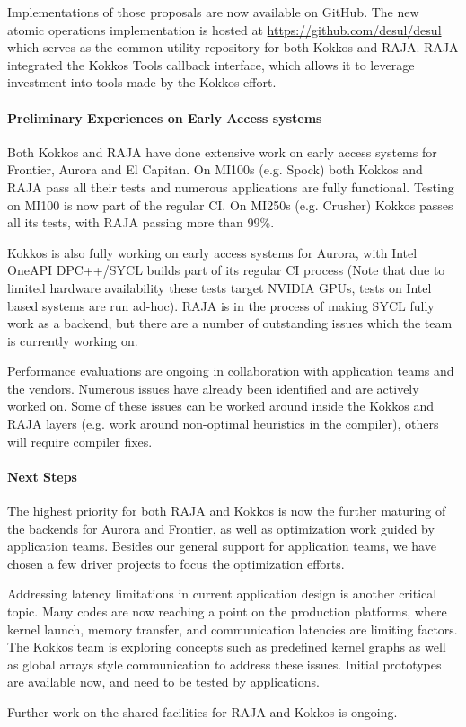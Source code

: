 Implementations of those proposals are now available on GitHub. 
The new atomic operations implementation is hosted at \url{https://github.com/desul/desul} which serves as the common utility repository for both Kokkos and RAJA.
RAJA integrated the Kokkos Tools callback interface, which allows it to leverage investment into tools made by the Kokkos effort.

\paragraph{Preliminary Experiences on Early Access systems}
Both Kokkos and RAJA have done extensive work on early access systems for Frontier, Aurora and El Capitan. On MI100s (e.g. Spock) both Kokkos and RAJA pass all their tests and numerous applications are fully functional. Testing on MI100 is now part of the regular CI. On MI250s (e.g. Crusher) Kokkos passes all its tests, with RAJA passing more than 99\%.

Kokkos is also fully working on early access systems for Aurora, with Intel OneAPI DPC++/SYCL builds part of its regular CI process (Note that due to limited hardware availability these tests target NVIDIA GPUs, tests on Intel based systems are run ad-hoc). RAJA is in the process of making SYCL fully work as a backend, but there are a number of outstanding issues which the team is currently working on.

 Performance evaluations are ongoing in collaboration with application teams and the vendors.  Numerous issues have already been identified and are actively worked on.  Some of these issues can be worked around inside the Kokkos and RAJA layers (e.g. work around non-optimal heuristics in the compiler), others will require compiler fixes.

\paragraph{Next Steps}

The highest priority for both RAJA and Kokkos is now the further maturing of the backends for Aurora and Frontier, as well as optimization work guided by application teams.
Besides our general support for application teams, we have chosen a few driver projects to focus the optimization efforts.

Addressing latency limitations in current application design is another critical topic.
Many codes are now reaching a point on the production platforms, where kernel launch, memory transfer, and communication latencies are limiting factors.
The Kokkos team is exploring concepts such as predefined kernel graphs as well as global arrays style communication to address these issues.
Initial prototypes are available now, and need to be tested by applications.

Further work on the shared facilities for RAJA and Kokkos is ongoing.

